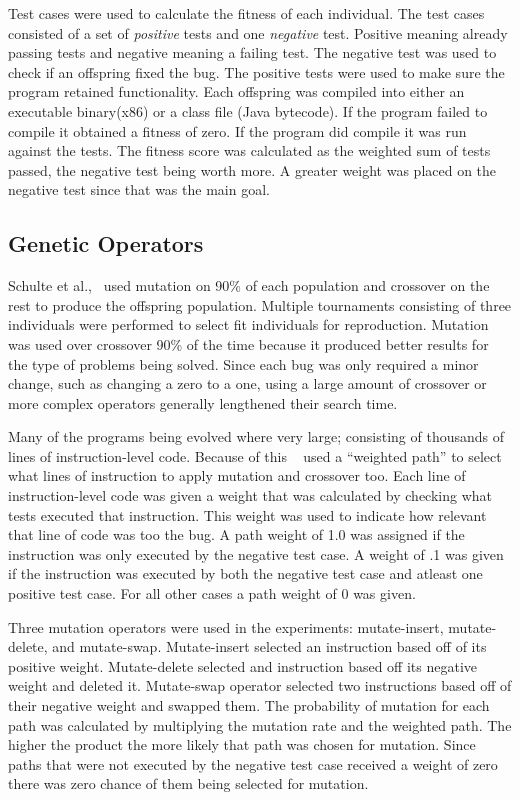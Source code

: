 \documentclass{sig-alternate}
\begin{document}
Test cases were used to calculate the fitness of each individual. The test cases consisted of a set of \textit{positive} tests and one \textit{negative} test. Positive meaning already passing tests and negative meaning a failing test. The negative test was used to check if an offspring fixed the bug. The positive tests were used to make sure the program retained functionality. Each offspring was compiled into either an executable binary(x86) or a class file (Java bytecode). If the program failed to compile it obtained a fitness of zero. If the program did compile it was run against the tests. The fitness score was calculated as the weighted sum of tests passed, the negative test being worth more. A greater weight was placed on the negative test since that was the main goal.

\subsection{Genetic Operators}
Schulte et al.,~\cite{Assembly:2010} used mutation on 90\% of each population and crossover on the rest to produce the offspring population. Multiple tournaments consisting of three individuals were performed to select fit individuals for reproduction. Mutation was used over crossover 90\% of the time because it produced better results for the type of problems being solved. Since each bug was only required a minor change, such as changing a zero to a one, using a large amount of crossover or more complex operators generally lengthened their search time.

Many of the programs being evolved where very large; consisting of thousands of lines of instruction-level code. Because of this ~\cite{Assembly:2010} used a ``weighted path'' to select what lines of instruction to apply mutation and crossover too. Each line of instruction-level code was given a weight that was calculated by checking what tests executed that instruction. This weight was used to indicate how relevant that line of code was too the bug. A path weight of 1.0 was assigned if the instruction was only executed by the negative test case. A weight of .1 was given if the instruction was executed by both the negative test case and atleast one positive test case. For all other cases a path weight of 0 was given.

Three mutation operators were used in the experiments: mutate-insert, mutate-delete, and mutate-swap. Mutate-insert selected an instruction based off of its positive weight. Mutate-delete selected and instruction based off its negative weight and deleted it. Mutate-swap operator selected two instructions based off of their negative weight and swapped them. The probability of mutation for each path was calculated by multiplying the mutation rate and the weighted path. The higher the product the more likely that path was chosen for mutation. Since paths that were not executed by the negative test case received a weight of zero there was zero chance of them being selected for mutation.
\end{document}
